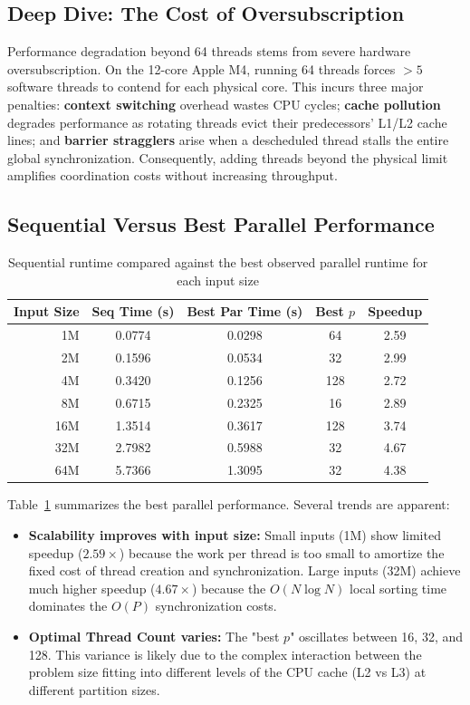 \documentclass[11pt]{article}
\begin{document}
\subsection{Deep Dive: The Cost of Oversubscription}
Performance degradation beyond 64 threads stems from severe hardware oversubscription. On the 12-core Apple M4, running 64 threads forces $>5$ software threads to contend for each physical core. This incurs three major penalties: \textbf{context switching} overhead wastes CPU cycles; \textbf{cache pollution} degrades performance as rotating threads evict their predecessors' L1/L2 cache lines; and \textbf{barrier stragglers} arise when a descheduled thread stalls the entire global synchronization. Consequently, adding threads beyond the physical limit amplifies coordination costs without increasing throughput.

\subsection{Sequential Versus Best Parallel Performance}

\begin{table}[h]
\centering
\caption{Sequential runtime compared against the best observed parallel runtime for each input size}
\label{tab:seq_vs_par}
\begin{tabular}{rcccc}
\hline
Input Size & Seq Time (s) & Best Par Time (s) & Best $p$ & Speedup \\
\hline
1M  & 0.0774 & 0.0298 & 64  & 2.59 \\
2M  & 0.1596 & 0.0534 & 32  & 2.99 \\
4M  & 0.3420 & 0.1256 & 128 & 2.72 \\
8M  & 0.6715 & 0.2325 & 16  & 2.89 \\
16M & 1.3514 & 0.3617 & 128 & 3.74 \\
32M & 2.7982 & 0.5988 & 32  & 4.67 \\
64M & 5.7366 & 1.3095 & 32  & 4.38 \\
\hline
\end{tabular}
\end{table}

Table~\ref{tab:seq_vs_par} summarizes the best parallel performance. Several trends are apparent:
\begin{itemize}
    \item \textbf{Scalability improves with input size:} Small inputs (1M) show limited speedup ($2.59\times$) because the work per thread is too small to amortize the fixed cost of thread creation and synchronization. Large inputs (32M) achieve much higher speedup ($4.67\times$) because the $O(N \log N)$ local sorting time dominates the $O(P)$ synchronization costs.
    \item \textbf{Optimal Thread Count varies:} The "best $p$" oscillates between 16, 32, and 128. This variance is likely due to the complex interaction between the problem size fitting into different levels of the CPU cache (L2 vs L3) at different partition sizes.
\end{itemize}
\FloatBarrier
\end{document}
